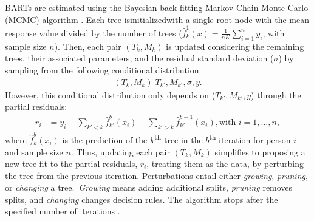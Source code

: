 \documentclass[10pt, a4paper, titlepage]{article}
\begin{document}
BARTs are estimated using the Bayesian back-fitting Markov Chain Monte Carlo (MCMC) algorithm \citep{chipman2010, hill2020, chipman2006, chipman1998,james2021}. Each tree isinitializedwith a single root node with the mean response value divided by the number of trees ($\hat{f}^1_k(x) = \frac{1}{nK}\sum_{i = 1}^{n}y_i$, with sample size $n$). Then, each pair $(T_k, M_k)$ is updated considering the remaining trees, their associated parameters, and the residual standard deviation ($\sigma$) by sampling from the following conditional distribution: 
\begin{align}
\label{eq:backfitting}
    (T_k, M_k)|T_{k'}, M_{k'}, \sigma, y.
\end{align} However, this conditional distribution only depends on ($T_{k'}, M_{k'}, y$) through the partial residuals:
\begin{align}
    \label{eq:partialresiduals}
    r_i &= y_i - \sum_{k' < k} \hat{f}^{b}_{k'}(x_{i}) - \sum_{k' > k} \hat{f}^{b-1}_{k'}(x_{i}), \text{with } i = 1, \dots, n,
    \end{align} where $\hat{f}^{b}_{k}(x_{i})$ is the prediction of the $k$\textsuperscript{th} tree in the $b$\textsuperscript{th} iteration for person $i$ and sample size $n$. Thus, updating each pair $(T_k, M_k)$ simplifies to proposing a new tree fit to the partial residuals, $r_{i}$, treating them as the data, by perturbing the tree from the previous iteration. Perturbations entail either \textit{growing}, \textit{pruning}, or \textit{changing} a tree.~\textit{Growing} means adding additional splits, \textit{pruning} removes splits, and \textit{changing} changes decision rules. The algorithm stops after the specified number of iterations \citep{chipman2010, hill2020, chipman2006, chipman1998, james2021}.
\end{document}

